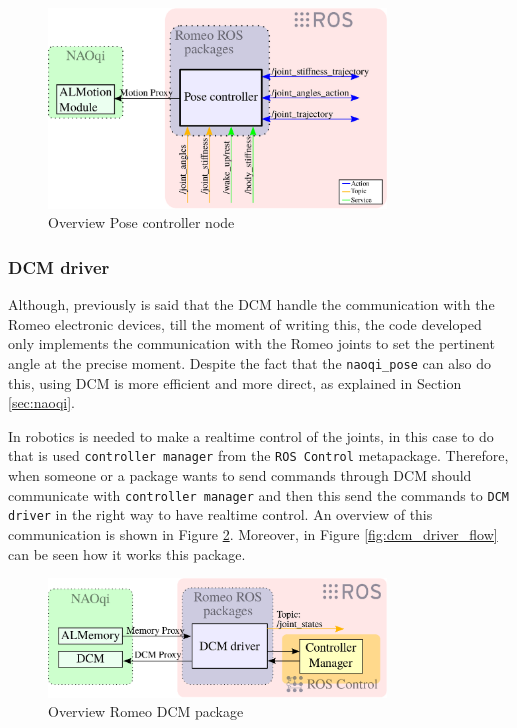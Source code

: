 \documentclass[12pt,a4paper,final,twoside,openright]{report}
\begin{document}
\begin{figure}[h]
\centering
\includegraphics[width=0.8\textwidth]{images/pose_controller.eps}
\caption{Overview Pose controller node\label{fig:pose_controller}}
\end{figure}

\subsubsection{DCM driver}

Although, previously is said that the DCM handle the communication with the Romeo electronic devices, till the moment of writing this, the code developed only implements the communication with the Romeo joints to set the pertinent angle at the precise moment. Despite the fact that the \texttt{naoqi\_pose} can also do this, using DCM is more efficient and more direct, as explained in Section \ref{sec:naoqi}.

In robotics is needed to make a realtime control of the joints, in this case to do that is used \texttt{controller manager} from the \texttt{ROS Control} metapackage. Therefore, when someone or a package wants to send commands through DCM should communicate with \texttt{controller manager} and then this send the commands to \texttt{DCM driver} in the right way to have realtime control. An overview of this communication is shown in Figure \ref{fig:dcm_driver}. Moreover, in Figure \ref{fig:dcm_driver_flow} can be seen how it works this package.

\begin{figure}[h]
\centering
\includegraphics[width=0.8\textwidth]{images/dcm_driver.eps}
\caption{Overview Romeo DCM package\label{fig:dcm_driver}}
\end{figure}
\end{document}
